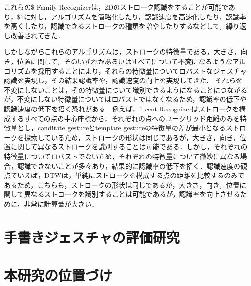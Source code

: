 これらの\$-Family Recognizerは，2Dのストローク認識をすることが可能であり，\$1に対し，アルゴリズムを簡略化したり，認識速度を高速化したり，認識率を高くしたり，認識できるストロークの種類を増やしたりするなどして，繰り返し改善されてきた．

しかしながらこれらのアルゴリズムは，ストロークの特徴量である，大きさ，向き，位置に関して，そのいずれかあるいはすべてについて不変になるようなアルゴリズムを採用することにより，それらの特徴量についてロバストなジェスチャ認識を実現し，その結果認識率や，認識速度の向上を実現してきた．
それらを不変にしないことは，その特徴量について識別できるようになることにつながるが，不変にしない特徴量についてはロバストではなくなるため，認識率の低下や認識速度の低下を招く恐れがある．例えば，1 cent Recognizerはストロークを構成するすべての点の中心座標から，それぞれの点へのユークリッド距離のみを特徴量とし，canditate gestureとtemplate gestureの特徴量の差が最小となるストロークを探索しているため，ストロークの形状は同じであるが，大きさ，向き，位置に関して異なるストロークを識別することは可能である．しかし，それぞれの特徴量についてロバストでないため，それぞれの特徴量について微妙に異なる場合，認識できないことが多々あり，結果的に認識率の低下を招く．認識速度の観点でいえば，DTWは，単純にストロークを構成する点の距離を比較するのみであるため，こちらも，ストロークの形状は同じであるが，大きさ，向き，位置に関して異なるストロークを識別することは可能であるが，認識率を向上させるために，非常に計算量が大きい．

\section{手書きジェスチャの評価研究}


\section{本研究の位置づけ}






